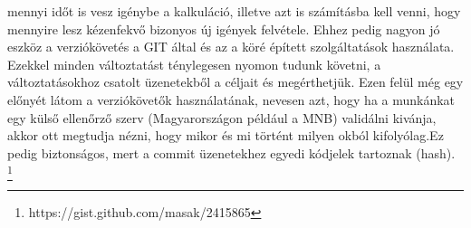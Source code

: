 \documentclass{article}
\theoremstyle{definition}
\theoremstyle{theorem}
\begin{document}
mennyi időt is vesz igénybe a kalkuláció, illetve azt is számításba kell venni, hogy mennyire lesz kézenfekvő bizonyos új igények felvétele. Ehhez pedig nagyon jó eszköz a verziókövetés a GIT által és az a köré épített szolgáltatások használata. Ezekkel minden változtatást ténylegesen nyomon tudunk követni, a változtatásokhoz csatolt üzenetekből a céljait és megérthetjük. Ezen felül még egy előnyét látom a verziókövetők használatának, nevesen azt, hogy ha a munkánkat egy külső ellenőrző szerv (Magyarországon például a MNB) validálni kivánja, akkor ott megtudja nézni, hogy mikor és mi történt milyen okból kifolyólag.Ez pedig biztonságos, mert a commit üzenetekhez egyedi kódjelek tartoznak (hash). \footnote{https://gist.github.com/masak/2415865}
\pagebreak
\listoffigures
\listoftables
\pagebreak


\end{document}
